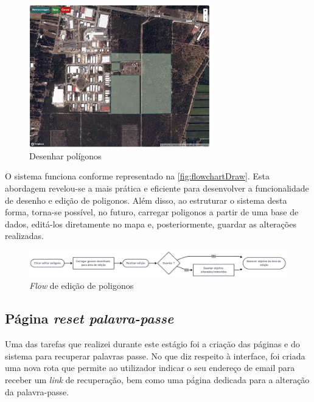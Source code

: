 \begin{figure}[h!]
    \centering
    \includegraphics[width=0.7\textwidth]{figs/draw.png}
    \caption{Desenhar polígonos}
    \label{fig:drawPoly}
\end{figure}


O sistema funciona conforme representado na \autoref{fig:flowchartDraw}. Esta abordagem revelou-se a mais prática e eficiente para desenvolver a funcionalidade de desenho e edição de poligonos. Além disso, ao estruturar o sistema desta forma, torna-se possível, no futuro, carregar poligonos a partir de uma base de dados, editá-los diretamente no mapa e, posteriormente, guardar as alterações realizadas.

\begin{figure}[h!]
    \centering
    \includegraphics[width=\textwidth]{figs/flowchart_draw.png}
    \caption{\textit{Flow} de edição de poligonos}
    \label{fig:flowchartDraw}
\end{figure}

\clearpage
\subsection{Página \textit{reset palavra-passe}}\label{sec:resetPassword} %
Uma das tarefas que realizei durante este estágio foi a criação das páginas e do sistema para recuperar palavras passe. No que diz respeito à interface, foi criada uma nova rota que permite ao utilizador indicar o seu endereço de email para receber um \textit{link} de recuperação, bem como uma página dedicada para a alteração da palavra-passe. 

